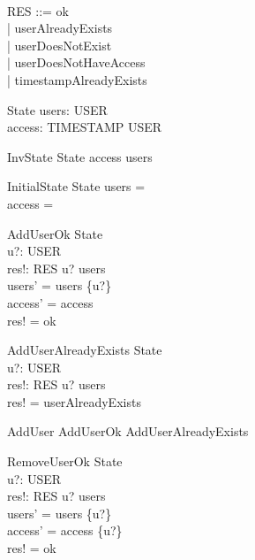 \begin{zed}
     \\
    RES ::= ok \\
          | userAlreadyExists \\
          | userDoesNotExist \\
          | userDoesNotHaveAccess \\
          | timestampAlreadyExists \\
\end{zed}

\begin{schema}{State}
    users: \power USER \\
    access: TIMESTAMP \pfun USER
\end{schema}

\begin{schema}{InvState}
    State
    \where
    \ran access \subseteq users
\end{schema}

\begin{schema}{InitialState}
    State
    \where
    users = \emptyset \\
    access = \emptyset
\end{schema}

\begin{schema}{AddUserOk}
    \Delta State \\
    u?: USER \\
    res!: RES
    \where
    u? \notin users \\
    users' = users \cup \{u?\} \\
    access' = access \\
    res! = ok
\end{schema}

\begin{schema}{AddUserAlreadyExists}
    \Xi State \\
    u?: USER \\
    res!: RES
    \where
    u? \in users \\
    res! = userAlreadyExists
\end{schema}

\begin{zed}
    AddUser  AddUserOk \lor AddUserAlreadyExists
\end{zed}

\begin{schema}{RemoveUserOk}
    \Delta State \\
    u?: USER \\
    res!: RES
    \where
    u? \in users \\
    users' = users \setminus \{u?\} \\
    access' = access \nrres \{u?\} \\
    res! = ok
\end{schema}

